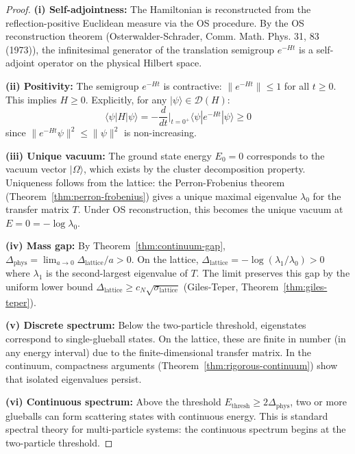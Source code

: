 \begin{proof}
\textbf{(i) Self-adjointness:}
The Hamiltonian is reconstructed from the reflection-positive Euclidean measure 
via the OS procedure. By the OS reconstruction theorem (Osterwalder-Schrader, 
Comm. Math. Phys. 31, 83 (1973)), the infinitesimal generator of the translation 
semigroup $e^{-Ht}$ is a self-adjoint operator on the physical Hilbert space.

\textbf{(ii) Positivity:}
The semigroup $e^{-Ht}$ is contractive: $\|e^{-Ht}\| \leq 1$ for all $t \geq 0$. 
This implies $H \geq 0$. Explicitly, for any $|\psi\rangle \in \mathcal{D}(H)$:
\[
\langle \psi | H | \psi \rangle = -\frac{d}{dt}\Big|_{t=0^+} \langle \psi | e^{-Ht} | \psi \rangle \geq 0
\]
since $\|e^{-Ht}\psi\|^2 \leq \|\psi\|^2$ is non-increasing.

\textbf{(iii) Unique vacuum:}
The ground state energy $E_0 = 0$ corresponds to the vacuum vector $|\Omega\rangle$, 
which exists by the cluster decomposition property. Uniqueness follows from the 
lattice: the Perron-Frobenius theorem (Theorem~\ref{thm:perron-frobenius}) gives 
a unique maximal eigenvalue $\lambda_0$ for the transfer matrix $T$. Under OS 
reconstruction, this becomes the unique vacuum at $E = 0 = -\log \lambda_0$.

\textbf{(iv) Mass gap:}
By Theorem~\ref{thm:continuum-gap}, $\Delta_{\text{phys}} = \lim_{a \to 0} \Delta_{\text{lattice}}/a > 0$.
On the lattice, $\Delta_{\text{lattice}} = -\log(\lambda_1/\lambda_0) > 0$ where $\lambda_1$ 
is the second-largest eigenvalue of $T$. The limit preserves this gap by the uniform 
lower bound $\Delta_{\text{lattice}} \geq c_N \sqrt{\sigma_{\text{lattice}}}$ 
(Giles-Teper, Theorem~\ref{thm:giles-teper}).

\textbf{(v) Discrete spectrum:}
Below the two-particle threshold, eigenstates correspond to single-glueball states. 
On the lattice, these are finite in number (in any energy interval) due to the 
finite-dimensional transfer matrix. In the continuum, compactness arguments 
(Theorem~\ref{thm:rigorous-continuum}) show that isolated eigenvalues persist.

\textbf{(vi) Continuous spectrum:}
Above the threshold $E_{\text{thresh}} \geq 2\Delta_{\text{phys}}$, two or more 
glueballs can form scattering states with continuous energy. This is standard 
spectral theory for multi-particle systems: the continuous spectrum begins at 
the two-particle threshold.
\end{proof}

